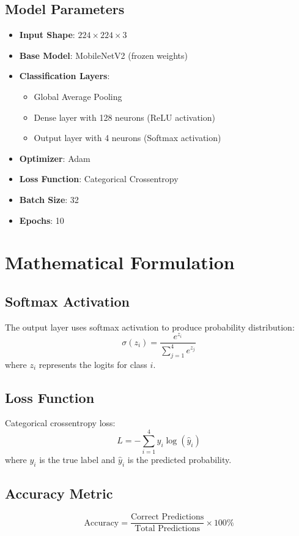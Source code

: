 \documentclass[12pt,a4paper]{article}
\begin{document}
\subsection{Model Parameters}
\begin{itemize}
    \item \textbf{Input Shape}: $224 \times 224 \times 3$
    \item \textbf{Base Model}: MobileNetV2 (frozen weights)
    \item \textbf{Classification Layers}: 
    \begin{itemize}
        \item Global Average Pooling
        \item Dense layer with 128 neurons (ReLU activation)
        \item Output layer with 4 neurons (Softmax activation)
    \end{itemize}
    \item \textbf{Optimizer}: Adam
    \item \textbf{Loss Function}: Categorical Crossentropy
    \item \textbf{Batch Size}: 32
    \item \textbf{Epochs}: 10
\end{itemize}

\section{Mathematical Formulation}

\subsection{Softmax Activation}
The output layer uses softmax activation to produce probability distribution:
\[
\sigma(z_i) = \frac{e^{z_i}}{\sum_{j=1}^{4} e^{z_j}}
\]
where $z_i$ represents the logits for class $i$.

\subsection{Loss Function}
Categorical crossentropy loss:
\[
L = -\sum_{i=1}^{4} y_i \log(\hat{y}_i)
\]
where $y_i$ is the true label and $\hat{y}_i$ is the predicted probability.

\subsection{Accuracy Metric}
\[
\text{Accuracy} = \frac{\text{Correct Predictions}}{\text{Total Predictions}} \times 100\%
\]
\end{document}
